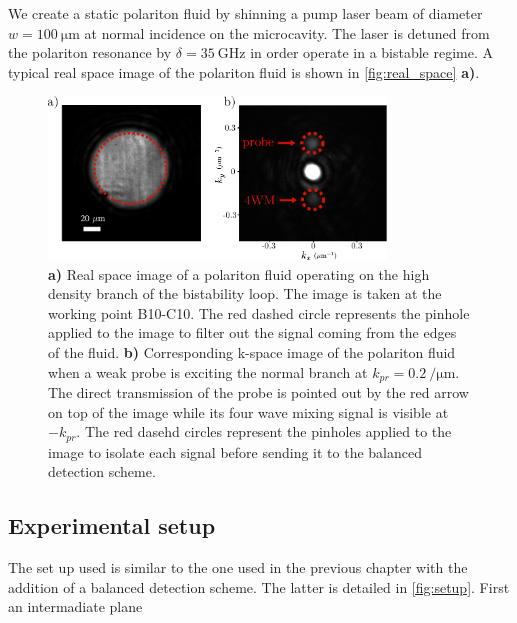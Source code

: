 We create a static polariton fluid by shinning a pump laser beam of diameter $w=\SI{100}{\micro\meter}$ at normal incidence on the microcavity. The laser is detuned from the polariton resonance by
$\delta = \SI{35}{\giga\hertz}$ in order operate in a bistable regime. A typical real space image of the polariton fluid is shown in \autoref{fig:real_space} \textbf{a)}. 
 
\begin{figure}
    \centering
    \includegraphics[width=0.8\textwidth]{chap_correlation/fig/r_and_k_space.pdf}
    \caption{\textbf{a)} Real space image of a polariton fluid operating on the high density branch of the bistability loop. The image is taken at the working point B10-C10. The red dashed circle represents
    the pinhole applied to the image to filter out the signal coming from the edges of the fluid. \textbf{b)} Corresponding k-space image of the polariton fluid when a weak probe is exciting the normal branch at $k_{pr}=\SI{0.2}{\per\micro\meter}$. 
    The direct transmission of the probe is pointed out by the red arrow on top of the image while its four wave mixing signal is visible at $-k_{pr}$. The red dasehd circles represent the pinholes applied 
    to the image to isolate each signal before sending it to the balanced detection scheme. }
    \label{fig:real_space}
\end{figure}
\subsection{Experimental setup}
The set up used is similar to the one used in the previous chapter with the addition of a balanced detection scheme. The latter is detailed in 
\autoref{fig:setup}. First an intermadiate plane 